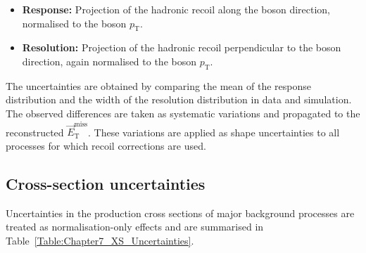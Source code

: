 \begin{itemize}
  \item \textbf{Response:} Projection of the hadronic recoil along the boson direction, normalised to the boson $p_\text{T}$.  
  \item \textbf{Resolution:} Projection of the hadronic recoil perpendicular to the boson direction, again normalised to the boson $p_\text{T}$.  
\end{itemize}

The uncertainties are obtained by comparing the mean of the response distribution and the width of the resolution distribution in data and simulation.  
The observed differences are taken as systematic variations and propagated to the reconstructed $\vec{E}^{\text{miss}}_\text{T}$. These variations are applied as shape uncertainties to all processes for which recoil corrections are used.

\subsection{Cross-section uncertainties}
Uncertainties in the production cross sections of major background processes are treated as normalisation-only effects and are summarised in Table~\ref{Table:Chapter7_XS_Uncertainties}.  

